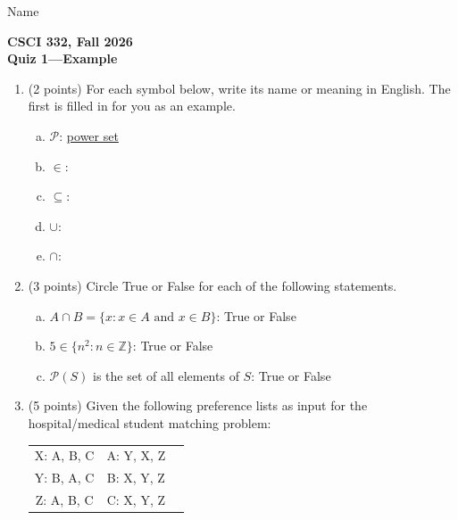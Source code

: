 \documentclass[11pt]{article}
\begin{document}
\noindent Name \underline{\hspace{12cm}}\\


\begin{center}
\Large\textbf{CSCI 332, Fall 2026}%
\\
\LARGE\textbf{Quiz 1---Example}%
\end{center}



\begin{enumerate}


\item (2 points) For each symbol below, write its name or meaning in English. The first is filled in for you as an example.

\begin{enumerate}[(a)]
    \item $\mathcal{P}$: \underline{power set}
    \item $\in$: \underline{\hspace{2in}}
    \item $\subseteq$: \underline{\hspace{2in}}
    \item $\cup$: \underline{\hspace{2in}}
    \item $\cap$: \underline{\hspace{2in}}
\end{enumerate}

\item (3 points) Circle True or False for each of the following statements.

\begin{enumerate}[(a)]
    \item $A \cap B = \{x : x \in A \text{ and } x \in B\}$: True or False
    \item $5 \in \{n^2 : n \in \mathbb{Z}\}$: True or False
    \item $\mathcal{P}(S)$ is the set of all elements of $S$: True or False
\end{enumerate}

\item (5 points) Given the following preference lists as input for the
hospital/medical student matching problem:

\begin{center}
\begin{tabular}{ c c c }
    X: A, B, C &  A: Y, X, Z\\
    Y: B, A, C & B: X, Y, Z\\
    Z: A, B, C &  C: X, Y, Z
\end{tabular}
\end{center}


\end{enumerate}
\end{document}
